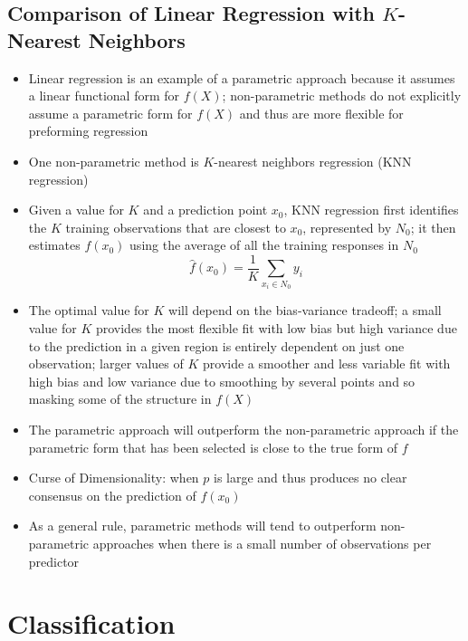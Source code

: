 \documentclass[12pt]{article}
\begin{document}
\subsection{Comparison of Linear Regression with $K$-Nearest Neighbors}
\begin{itemize}
\item Linear regression is an example of a parametric approach because it assumes a linear functional form for $f(X)$; non-parametric methods do not explicitly assume a parametric form for $f(X)$ and thus are more flexible for preforming regression
\item One non-parametric method is $K$-nearest neighbors regression (KNN regression) 
\item Given a value for $K$ and a prediction point $x_0$, KNN regression first identifies the $K$ training observations that are closest to $x_0$, represented by $N_0$; it then estimates $f(x_0)$ using the average of all the training responses in $N_0$ $$ \hat{f}(x_0) = \frac{1}{K}\sum_{x_i \in N_0} y_i $$ 
\item The optimal value for $K$ will depend on the bias-variance tradeoff; a small value for $K$ provides the most flexible fit with low bias but high variance due to the prediction in a given region is entirely dependent on just one observation; larger values of $K$ provide a smoother and less variable fit with high bias and low variance due to smoothing by several points and so masking some of the structure in $f(X)$
\item The parametric approach will outperform the non-parametric approach if the parametric form that has been selected is close to the true form of $f$ 
\item Curse of Dimensionality: when $p$ is large and thus produces no clear consensus on the prediction of $f(x_0)$
\item As a general rule, parametric methods will tend to outperform non-parametric approaches when there is a small number of observations per predictor 
\end{itemize} \newpage

\section{Classification} 
\end{document}
